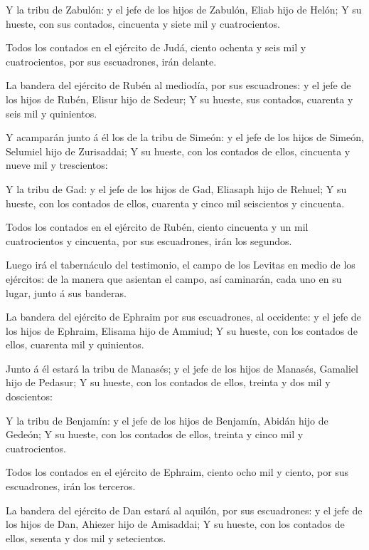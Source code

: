  Y la tribu de Zabulón: y el jefe de los hijos de Zabulón,
Eliab hijo de Helón;  Y su hueste, con sus contados,
cincuenta y siete mil y cuatrocientos.

 Todos los contados en el ejército de Judá, ciento ochenta
y seis mil y cuatrocientos, por sus escuadrones, irán delante.

 La bandera del ejército de Rubén al mediodía, por sus
escuadrones: y el jefe de los hijos de Rubén, Elisur hijo de Sedeur;
 Y su hueste, sus contados, cuarenta y seis mil y
quinientos.

 Y acamparán junto á él los de la tribu de Simeón: y el
jefe de los hijos de Simeón, Selumiel hijo de Zurisaddai;
 Y su hueste, con los contados de ellos, cincuenta y
nueve mil y trescientos:

 Y la tribu de Gad: y el jefe de los hijos de Gad,
Eliasaph hijo de Rehuel;  Y su hueste, con los contados
de ellos, cuarenta y cinco mil seiscientos y cincuenta.

 Todos los contados en el ejército de Rubén, ciento
cincuenta y un mil cuatrocientos y cincuenta, por sus escuadrones, irán
los segundos.

 Luego irá el tabernáculo del testimonio, el campo de los
Levitas en medio de los ejércitos: de la manera que asientan el campo,
así caminarán, cada uno en su lugar, junto á sus banderas.

 La bandera del ejército de Ephraim por sus escuadrones,
al occidente: y el jefe de los hijos de Ephraim, Elisama hijo de Ammiud;
 Y su hueste, con los contados de ellos, cuarenta mil y
quinientos.

 Junto á él estará la tribu de Manasés; y el jefe de los
hijos de Manasés, Gamaliel hijo de Pedasur;  Y su hueste,
con los contados de ellos, treinta y dos mil y doscientos:

 Y la tribu de Benjamín: y el jefe de los hijos de
Benjamín, Abidán hijo de Gedeón;  Y su hueste, con los
contados de ellos, treinta y cinco mil y cuatrocientos.

 Todos los contados en el ejército de Ephraim, ciento
ocho mil y ciento, por sus escuadrones, irán los terceros.

 La bandera del ejército de Dan estará al aquilón, por
sus escuadrones: y el jefe de los hijos de Dan, Ahiezer hijo de
Amisaddai;  Y su hueste, con los contados de ellos,
sesenta y dos mil y setecientos.

